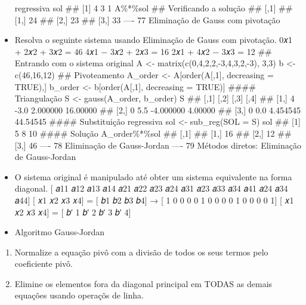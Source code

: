 \documentclass[
]{article}
\providecommand{\tightlist}{%
  \setlength{\itemsep}{0pt}\setlength{\parskip}{0pt}}
\begin{document}
\begin{itemize}
  regressiva sol \#\# {[}1{]} 4 3 1 A\%*\%sol \#\# Verificando a solução
  \#\# {[},1{]} \#\# {[}1,{]} 24 \#\# {[}2,{]} 23 \#\# {[}3,{]} 33 ----
  77 Eliminação de Gauss com pivotação
\item
  Resolva o seguinte sistema usando Eliminação de Gauss com pivotação.
  0𝑥1 + 2𝑥2 + 3𝑥2 = 46 4𝑥1 − 3𝑥2 + 2𝑥3 = 16 2𝑥1 + 4𝑥2 − 3𝑥3 = 12 \#\#
  Entrando com o sistema original A \textless-
  matrix(c(0,4,2,2,-3,4,3,2,-3), 3,3) b \textless- c(46,16,12) \#\#
  Pivoteamento A\_order \textless- A{[}order(A{[},1{]}, decreasing =
  TRUE),{]} b\_order \textless- b{[}order(A{[},1{]}, decreasing =
  TRUE){]} \#\#\#\# Triangulação S \textless- gauss(A\_order, b\_order)
  S \#\# {[},1{]} {[},2{]} {[},3{]} {[},4{]} \#\# {[}1,{]} 4 -3.0
  2.000000 16.00000 \#\# {[}2,{]} 0 5.5 -4.000000 4.00000 \#\# {[}3,{]}
  0 0.0 4.454545 44.54545 \#\#\#\# Substituição regressiva sol
  \textless- sub\_reg(SOL = S) sol \#\# {[}1{]} 5 8 10 \#\#\#\# Solução
  A\_order\%*\%sol \#\# {[},1{]} \#\# {[}1,{]} 16 \#\# {[}2,{]} 12 \#\#
  {[}3,{]} 46 ---- 78 Eliminação de Gauss-Jordan ---- 79 Métodos
  diretos: Eliminação de Gauss-Jordan
\item
  O sistema original é manipulado até obter um sistema equivalente na
  forma diagonal. {[} 𝑎11 𝑎12 𝑎13 𝑎14 𝑎21 𝑎22 𝑎23 𝑎24 𝑎31 𝑎23 𝑎33 𝑎34
  𝑎41 𝑎24 𝑎34 𝑎44{]} {[} 𝑥1 𝑥2 𝑥3 𝑥4{]} = {[} 𝑏1 𝑏2 𝑏3 𝑏4{]} → {[} 1 0 0
  0 0 1 0 0 0 0 1 0 0 0 0 1{]} {[} 𝑥1 𝑥2 𝑥3 𝑥4{]} = {[} 𝑏′ 1 𝑏′ 2 𝑏′ 3
  𝑏′ 4{]}
\item
  Algoritmo Gauss-Jordan
\end{itemize}

\begin{enumerate}
\def\labelenumi{\arabic{enumi}.}
\tightlist
\item
  Normalize a equação pivô com a divisão de todos os seus termos pelo
  coeficiente pivô.
\item
  Elimine os elementos fora da diagonal principal em TODAS as demais
  equações usando operaçõs de linha.
\end{enumerate}
\end{document}

